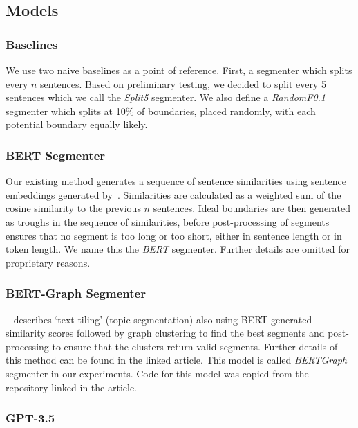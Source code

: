 \subsection{Models}

\subsubsection{Baselines}

We use two naive baselines as a point of reference. First, a segmenter which splits every $n$ sentences. Based on preliminary testing, we decided to split every 5 sentences which we call the \emph{Split5} segmenter. We also define a \emph{RandomF0.1} segmenter which splits at 10\% of boundaries, placed randomly, with each potential boundary equally likely.

\subsubsection{BERT Segmenter}

Our existing method generates a sequence of sentence similarities using sentence embeddings generated by~\cite{SentenceBERT}. Similarities are calculated as a weighted sum of the cosine similarity to the previous $n$ sentences. Ideal boundaries are then generated as troughs in the sequence of similarities, before post-processing of segments ensures that no segment is too long or too short, either in sentence length or in token length. We name this the \emph{BERT} segmenter. Further details are omitted for proprietary reasons.

\subsubsection{BERT-Graph Segmenter}

~\cite{MasimilianoSegmenter} describes `text tiling' (topic segmentation) also using BERT-generated similarity scores followed by graph clustering to find the best segments and post-processing to ensure that the clusters return valid segments. Further details of this method can be found in the linked article. This model is called \emph{BERTGraph} segmenter in our experiments. Code for this model was copied from the repository linked in the article.

\subsubsection{GPT-3.5}


